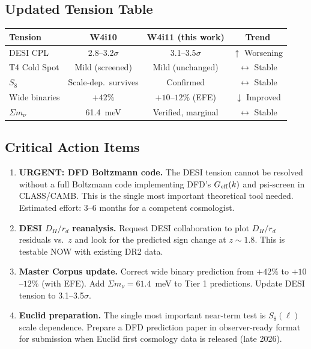 \documentclass[11pt,a4paper]{article}
\begin{document}
\subsection{Updated Tension Table}

\begin{center}
\begin{tabular}{lccc}
\toprule
\textbf{Tension} & \textbf{W4i10} & \textbf{W4i11 (this work)} &
  \textbf{Trend} \\
\midrule
DESI CPL & 2.8--3.2$\sigma$ & 3.1--3.5$\sigma$ & $\uparrow$
  Worsening \\
T4 Cold Spot & Mild (screened) & Mild (unchanged) & $\leftrightarrow$
  Stable \\
$S_8$ & Scale-dep.\ survives & Confirmed & $\leftrightarrow$ Stable \\
Wide binaries & $+42\%$ & $+10$--$12\%$ (EFE) & $\downarrow$ Improved \\
$\Sigma m_\nu$ & 61.4~meV & Verified, marginal & $\leftrightarrow$
  Stable \\
\bottomrule
\end{tabular}
\end{center}

\subsection{Critical Action Items}

\begin{enumerate}
\item \textbf{URGENT: DFD Boltzmann code.} The DESI tension cannot be
  resolved without a full Boltzmann code implementing DFD's
  $G_{\rm eff}(k)$ and psi-screen in CLASS/CAMB. This is the single
  most important theoretical tool needed. Estimated effort: 3--6 months
  for a competent cosmologist.

\item \textbf{DESI $D_H/r_d$ reanalysis.} Request DESI collaboration
  to plot $D_H/r_d$ residuals vs.\ $z$ and look for the predicted sign
  change at $z \sim 1.8$. This is testable NOW with existing DR2 data.

\item \textbf{Master Corpus update.} Correct wide binary prediction
  from $+42\%$ to $+10$--$12\%$ (with EFE). Add $\Sigma m_\nu = 61.4$~meV
  to Tier 1 predictions. Update DESI tension to 3.1--3.5$\sigma$.

\item \textbf{Euclid preparation.} The single most important near-term
  test is $S_8(\ell)$ scale dependence. Prepare a DFD prediction paper
  in observer-ready format for submission when Euclid first cosmology
  data is released (late 2026).
\end{enumerate}
\end{document}

